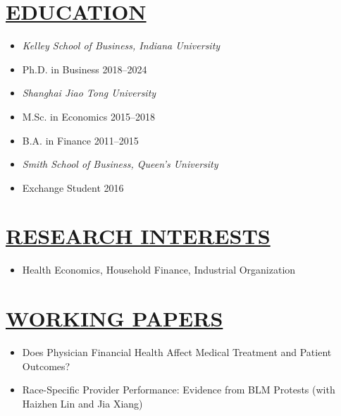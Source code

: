 \documentclass{res}
\begin{document}
\begin{resume}
\section{\large{\ul{EDUCATION}}}
\vspace{1.8em}
\begin{itemize}[leftmargin=!,labelindent=-15pt,itemindent=-15pt,itemsep=0.1em]
  \item[] \textit{Kelley School of Business, Indiana University} 
  \item[] \hspace{15pt} Ph.D. in Business \hfill    2018--2024 
  \item[] \textit{Shanghai Jiao Tong University}                                  
  \item[] \hspace{15pt} M.Sc. in Economics     \hfill    2015--2018
  \item[] \hspace{15pt} B.A. in Finance  \hfill    2011--2015
  \item[] \textit{Smith School of Business, Queen's University}                                         
  \item[] \hspace{15pt} Exchange Student \hfill     2016
\end{itemize}

\section{\large{\ul{RESEARCH INTERESTS}}}
\vspace{1.8em}
\begin{itemize}[leftmargin=!,labelindent=-15pt,itemindent=-15pt,itemsep=0.1em]
  \item[] Health Economics, Household Finance, Industrial Organization 
\end{itemize}

\section{\large{\ul{WORKING PAPERS}}}
\vspace{1.8em}
\begin{itemize}[leftmargin=!,labelindent=-15pt,itemindent=-15pt,itemsep=0.1em]
    \item[] Does Physician Financial Health Affect Medical Treatment and Patient Outcomes?   
    \item[] Race-Specific Provider Performance: Evidence from BLM Protests (with Haizhen Lin and Jia Xiang)
\end{itemize}


\end{resume}
\end{document}
